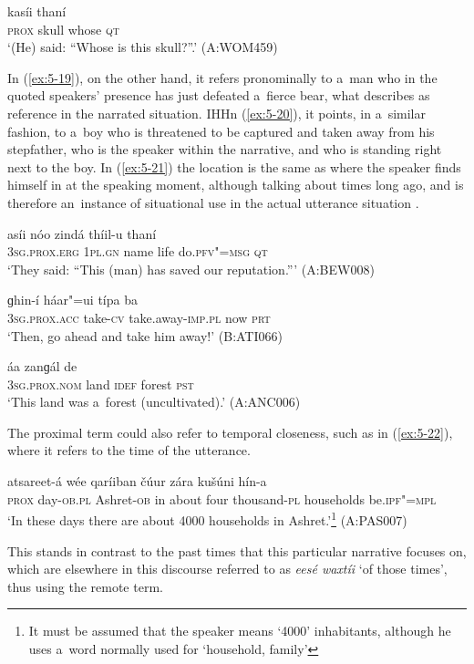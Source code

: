\begin{exe}
\ex
\label{ex:5-18}
 kasíi thaní \\
\textsc{prox} skull whose \textsc{qt} \\
\glt `(He) said: ``Whose is this skull?''.' (A:WOM459)
\end{exe}
In (\ref{ex:5-19}), on the other hand, it refers pronominally to a~man who in the quoted speakers' presence has just defeated a~fierce bear, what \citet[222]{himmelmann1996} describes as reference in the narrated situation. IHHn (\ref{ex:5-20}), it points, in a~similar fashion, to a~boy who is threatened to be captured and taken away from his stepfather, who is the speaker within the narrative, and who is standing right next to the boy. In (\ref{ex:5-21}) the location is the same as where the speaker finds himself in at the speaking moment, although talking about times long ago, and is therefore an~instance of situational use in the actual utterance situation \citep[222]{himmelmann1996}.

\begin{exe}
\ex
\label{ex:5-19}
\gll [aníi] asíi nóo zindá thíil-u thaní \\
\textsc{3sg}.\textsc{prox.erg} \textsc{1pl.gn} name life do.\textsc{pfv"=msg} \textsc{qt} \\
\glt `They said: ``This (man) has saved our reputation.''' (A:BEW008)

\ex
\label{ex:5-20}
\gll [hanís] ɡhin-í háar"=ui típa ba \\
\textsc{3sg}.\textsc{prox.acc} take-\textsc{cv} take.away-\textsc{imp.pl} now \textsc{prt} \\
\glt `Then, go ahead and take him away!' (B:ATI066)

\ex
\label{ex:5-21}
 áa zanɡál de \\
\textsc{3sg}.\textsc{prox.nom} land \textsc{idef} forest \textsc{pst} \\
\glt `This land was a~forest (uncultivated).' (A:ANC006)
\end{exe}
The proximal term could also refer to temporal closeness, such as in (\ref{ex:5-22}), where it refers to the time of the utterance.

\begin{exe}
\ex
\label{ex:5-22}
 atsareet-á wée qaríiban čúur zára kušúni
hín-a \\
\textsc{prox} day-\textsc{ob.pl} Ashret-\textsc{ob} in about four thousand-\textsc{pl} households
be.\textsc{ipf"=mpl} \\
\glt `In these days there are about 4000 households in Ashret.'\footnote{It must be assumed that the speaker means `4000' inhabitants, although he uses a~word normally used for `household, family'} (A:PAS007)
\end{exe}
This stands in contrast to the past times that this particular narrative focuses on, which are elsewhere in this discourse referred to as \textit{eesé waxtíi} `of those times', thus using the remote term.

